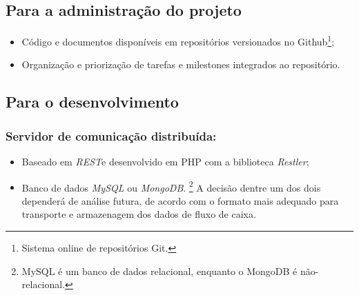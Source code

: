 \documentclass[a4paper]{abnt}
\begin{document}
\subsection{Para a administração do projeto}
\begin{itemize}
	\item Código e documentos disponíveis em repositórios versionados no Github\footnote{Sistema online de repositórios Git.};
	\item Organização e priorização de tarefas e milestones integrados ao repositório.
\end{itemize}
	
\subsection{Para o desenvolvimento}

\subsubsection{Servidor de comunicação distribuída:}
\begin{itemize}
	\item Baseado em \emph{REST}\footnotemark e desenvolvido em PHP com a biblioteca \emph{Restler}\footnotemark;
		\addtocounter{footnote}{-2}
		 
		 

	\item Banco de dados \emph{MySQL} ou \emph{MongoDB}.
		\footnote{MySQL é um banco de dados relacional, enquanto o MongoDB é não-relacional.} A decisão dentre um dos dois dependerá de análise futura, de acordo com o formato mais adequado para transporte e armazenagem dos dados de fluxo de caixa.
\end{itemize}
\end{document}
